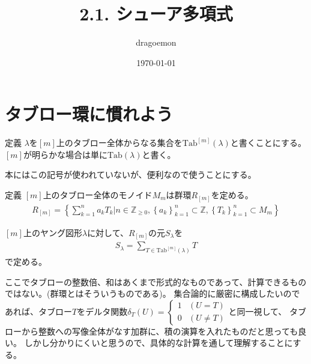 \documentclass[a4paper,11pt]{jsarticle}
\theoremstyle{plain}
\theoremstyle{definition}
\renewcommand{\(}{\left(}
\renewcommand{\)}{\right)}
\renewcommand{\[}{\left[}
\renewcommand{\]}{\right]}
\renewcommand{\{}{\left\lbrace}
\renewcommand{\}}{\right\rbrace}
\newcommand{\Z}{\mathbb{Z}}
\begin{document}
\title{2.1. シューア多項式}
\author{dragoemon}
\date{\today}
\maketitle




\section{タブロー環に慣れよう}

\begin{itembox}[l]{定義}
    $\lambda$を$[m]$上のタブロー全体からなる集合を$\text{Tab}^{[m]}(\lambda)$と書くことにする。$[m]$が明らかな場合は単に$\text{Tab}(\lambda)$と書く。
\end{itembox}

本にはこの記号が使われていないが、便利なので使うことにする。





\begin{itembox}[l]{定義}
    $[m]$上のタブロー全体のモノイド$M_m$は群環$R_{[m]}$を定める。
    \begin{align*}
        R_{[m]} = \{ \sum_{k=1}^{n} a_k T_k | n \in \Z_{\geq 0},  \{a_k\}_{k=1}^{n} \subset \Z, \{T_k\}_{k=1}^{n} \subset M_m\}
    \end{align*}
    
    $[m]$上のヤング図形$\lambda$に対して、$R_{[m]}$の元$S_{\lambda}$を
    \begin{align*}
        S_{\lambda} = \sum_{T \in \text{Tab}^{[m]}(\lambda)} T
    \end{align*}
    で定める。
\end{itembox}

ここでタブローの整数倍、和はあくまで形式的なものであって、計算できるものではない。(群環とはそういうものである)。
集合論的に厳密に構成したいのであれば、タブロー$T$をデルタ関数$\delta_{T}(U) = \begin{cases} 1 & (U = T) \\ 0 & (U \neq T) \end{cases}$と同一視して、
タブローから整数への写像全体がなす加群に、積の演算を入れたものだと思っても良い。
しかし分かりにくいと思うので、具体的な計算を通して理解することにする。
\end{document}
